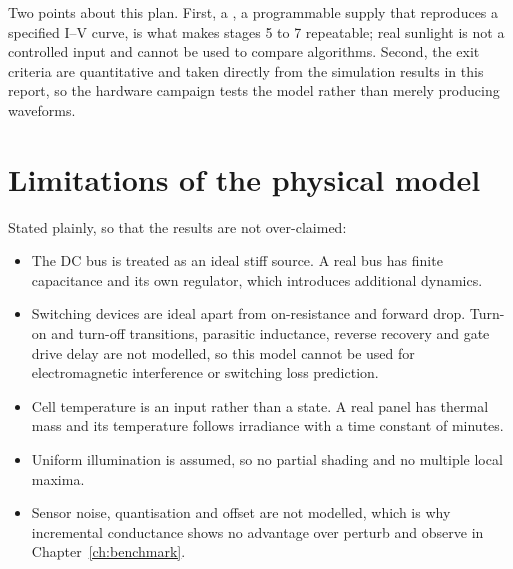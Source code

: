 Two points about this plan. First, a , a
programmable supply that reproduces a specified I--V curve, is what makes stages
5 to 7 repeatable; real sunlight is not a controlled input and cannot be used to
compare algorithms. Second, the exit criteria are quantitative and taken
directly from the simulation results in this report, so the hardware campaign
tests the model rather than merely producing waveforms.

\section{Limitations of the physical model}

Stated plainly, so that the results are not over-claimed:

\begin{itemize}[leftmargin=1.4em]
  \item The DC bus is treated as an ideal stiff source. A real bus has finite
        capacitance and its own regulator, which introduces additional dynamics.
  \item Switching devices are ideal apart from on-resistance and forward drop.
        Turn-on and turn-off transitions, parasitic inductance, reverse recovery
        and gate drive delay are not modelled, so this model cannot be used for
        electromagnetic interference or switching loss prediction.
  \item Cell temperature is an input rather than a state. A real panel has
        thermal mass and its temperature follows irradiance with a time constant
        of minutes.
  \item Uniform illumination is assumed, so no partial shading and no multiple
        local maxima.
  \item Sensor noise, quantisation and offset are not modelled, which is why
        incremental conductance shows no advantage over perturb and observe in
        Chapter~\ref{ch:benchmark}.
\end{itemize}
